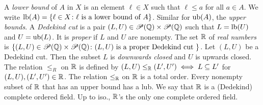  A \textit{lower bound} of $A$ in $X$ is an element $\ell \in X$ such that $\ell \leq a$ for all $a \in A$. We write $\operatorname{lb}(A) = \{ \ell \in X \colon \ell \text{ is a lower bound of } A \}$. Similar for $\operatorname{ub}(A)$, the \textit{upper bounds}.
 A \textit{Dedekind cut} is a pair $(L, U) \in \operatorname{\mathscr{P}}(\operatorname{\mathbb{Q}}) \times \operatorname{\mathscr{P}}(\operatorname{\mathbb{Q}})$ such that $L = \operatorname{lb}(U)$ and $U = \operatorname{ub}(L)$. It is \textit{proper} if $L$ and $U$ are nonempty.
 The set $\operatorname{\mathbb{R}}$ of \textit{real numbers} is $\{ (L, U) \in \operatorname{\mathscr{P}}(\operatorname{\mathbb{Q}}) \times \operatorname{\mathscr{P}}(\operatorname{\mathbb{Q}}) \colon (L, U) \text{ is a proper Dedekind cut } \}$.
 Let $(L, U)$ be a Dedekind cut. Then the subset $L$ is \textit{downwards closed} and $U$ is upwards closed.
 The relation $\leq_R$ on $\operatorname{\mathbb{R}}$ is defined by $(L, U) \leq_{\operatorname{\mathbb{R}}} (L', U') \iff L \subseteq L'$ for $(L, U), (L', U') \in \operatorname{\mathbb{R}}$.
 The relation $\leq_{\operatorname{\mathbb{R}}}$ on $\operatorname{\mathbb{R}}$ is a total order.
 Every nonempty subset of $\operatorname{\mathbb{R}}$ that has an upper bound has a lub. We say that $\operatorname{\mathbb{R}}$ is a (Dedekind) complete ordered field.
 Up to iso., $\operatorname{\mathbb{R}}$'s the only one complete ordered field.
